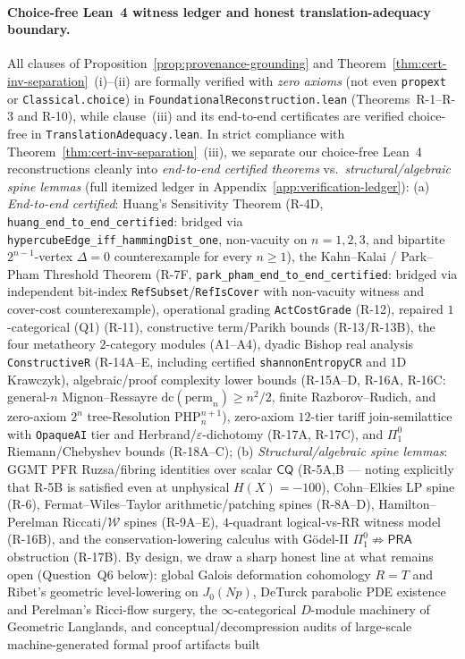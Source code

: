 \documentclass[11pt]{article}
\theoremstyle{plain}
\theoremstyle{definition}
\begin{document}
\paragraph{Choice-free Lean~4 witness ledger and honest translation-adequacy boundary.}
All clauses of Proposition~\ref{prop:provenance-grounding} and Theorem~\ref{thm:cert-inv-separation}~(i)--(ii) are formally verified with \emph{zero axioms} (not even \texttt{propext} or \texttt{Classical.choice}) in \texttt{FoundationalReconstruction.lean} (Theorems~R-1--R-3 and R-10), while clause~(iii) and its end-to-end certificates are verified choice-free in \texttt{TranslationAdequacy.lean}. In strict compliance with Theorem~\ref{thm:cert-inv-separation}~(iii), we separate our choice-free Lean~4 reconstructions cleanly into \emph{end-to-end certified theorems} vs.\ \emph{structural/algebraic spine lemmas} (full itemized ledger in Appendix~\ref{app:verification-ledger}): (a) \emph{End-to-end certified}: Huang's Sensitivity Theorem (R-4D, \texttt{huang\_\allowbreak end\_\allowbreak to\_\allowbreak end\_\allowbreak certified}: bridged via \texttt{hypercubeEdge\_\allowbreak iff\_\allowbreak hammingDist\_\allowbreak one}, non-vacuity on $n = 1,2,3$, and bipartite $2^{n-1}$-vertex $\Delta = 0$ counterexample for every $n \ge 1$), the Kahn--Kalai / Park--Pham Threshold Theorem (R-7F, \texttt{park\_\allowbreak pham\_\allowbreak end\_\allowbreak to\_\allowbreak end\_\allowbreak certified}: bridged via independent bit-index \texttt{RefSubset}/\texttt{RefIsCover} with non-vacuity witness and cover-cost counterexample), operational grading \texttt{ActCostGrade} (R-12), repaired $1$-categorical (Q1) (R-11), constructive term/Parikh bounds (R-13/R-13B), the four metatheory $2$-category modules (A1--A4), dyadic Bishop real analysis \texttt{ConstructiveR} (R-14A--E, including certified \texttt{shannonEntropyCR} and $1$D Krawczyk), algebraic/proof complexity lower bounds (R-15A--D, R-16A, R-16C: general-$n$ Mignon--Ressayre $\mathrm{dc}(\mathrm{perm}_n)\ge n^2/2$, finite Razborov--Rudich, and zero-axiom $2^n$ tree-Resolution $\mathrm{PHP}_n^{n+1}$), zero-axiom $12$-tier tariff join-semilattice with \texttt{OpaqueAI} tier and Herbrand/$\varepsilon$-dichotomy (R-17A, R-17C), and $\Pi^0_1$ Riemann/Chebyshev bounds (R-18A--C); (b) \emph{Structural/algebraic spine lemmas}: GGMT PFR Ruzsa/fibring identities over scalar $\mathsf{CQ}$ (R-5A,B --- noting explicitly that R-5B is satisfied even at unphysical $H(X) = -100$), Cohn--Elkies LP spine (R-6), Fermat--Wiles--Taylor arithmetic/patching spines (R-8A--D), Hamilton--Perelman Riccati/$\mathcal{W}$ spines (R-9A--E), $4$-quadrant logical-vs-RR witness model (R-16B), and the conservation-lowering calculus with G\"odel-II $\Pi^0_1\not\Rightarrow\mathsf{PRA}$ obstruction (R-17B). By design, we draw a sharp honest line at what remains open (Question~Q6 below): global Galois deformation cohomology $R = T$ and Ribet's geometric level-lowering on $J_0(Np)$, DeTurck parabolic PDE existence and Perelman's Ricci-flow surgery, the $\infty$-categorical $D$-module machinery of Geometric Langlands, and conceptual/decompression audits of large-scale machine-generated formal proof artifacts built 
\end{document}
